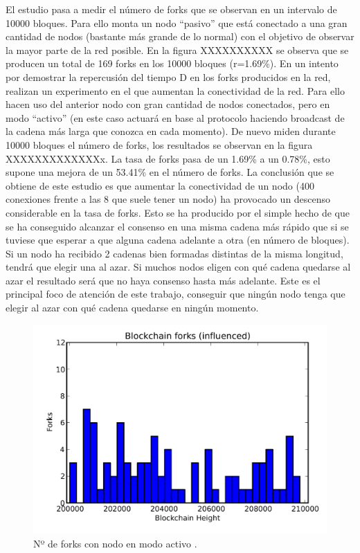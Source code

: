 El estudio pasa a medir el número de forks que se observan en un intervalo de 10000 bloques. Para ello monta un nodo “pasivo” que está conectado a una gran cantidad de nodos (bastante más grande de lo normal) con el objetivo de observar la mayor parte de la red posible. En la figura XXXXXXXXXX se observa que se producen un total de 169 forks en los 10000 bloques (r=1.69\%). En un intento por demostrar la repercusión del tiempo D en los forks producidos en la red, realizan un experimento en el que aumentan la conectividad de la red. Para ello hacen uso del anterior nodo con gran cantidad de nodos conectados, pero en modo “activo” (en este caso actuará en base al protocolo haciendo broadcast de la cadena más larga que conozca en cada momento). De nuevo miden durante 10000 bloques el número de forks, los resultados se observan en la figura XXXXXXXXXXXXXx. La tasa de forks pasa de un 1.69\% a un 0.78\%, esto supone una mejora de un 53.41\% en el número de forks. La conclusión que se obtiene de este estudio es que aumentar la conectividad de un nodo (400 conexiones frente a las 8 que suele tener un nodo) ha provocado un descenso considerable en la tasa de forks. Esto se ha producido por el simple hecho de que se ha conseguido alcanzar el consenso en una misma cadena más rápido que si se tuviese que esperar a que alguna cadena adelante a otra (en número de bloques). Si un nodo ha recibido 2 cadenas bien formadas distintas de la misma longitud, tendrá que elegir una al azar. Si muchos nodos eligen con qué cadena quedarse al azar el resultado será que no haya consenso hasta más adelante. Este es el principal foco de atención de este trabajo, conseguir que ningún nodo tenga que elegir al azar con qué cadena quedarse en ningún momento.


\begin{figure}
	\centering
	\includegraphics[width=1\textwidth]{imagenes/figura3.PNG}
	\caption{\label{fig1}Nº de forks con nodo en modo activo \cite{forks}.}
\end{figure}

